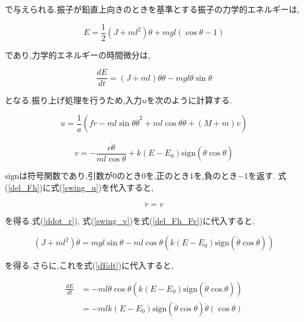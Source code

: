 で与えられる.振子が鉛直上向きのときを基準とする振子の力学的エネルギーは,

\begin{equation}
    E = \frac{1}{2} \left( J + ml^2 \right) \ddot{\theta}
        + mgl \left( \cos{\theta} - 1 \right)
\end{equation}

であり,力学的エネルギーの時間微分は,

\begin{equation}
    \frac{dE}{dt} = (J + ml) \theta \ddot{\theta}
                    - mgl \dot{\theta} \sin{\theta}
    \label{dEdt}
\end{equation}

となる.振り上げ処理を行うため,入力$u$を次のように計算する.

\begin{equation}
    u = \frac{1}{a}
        \left(
            f \dot{r} - ml \sin{\theta} \dot{\theta}^2 + ml \cos{\theta} \ddot{\theta}
            + (M + m)v
        \right)
    \label{swing_u}
\end{equation}

\begin{equation}
    v = - \frac{c \dot{\theta}}{ml\cos{\theta}} 
        + k(E - E_{0}) \mbox{sign}(\dot{\theta}\cos{\theta})
    \label{swing_v}
\end{equation}

$\mbox{sign}$は符号関数であり,引数が$0$のとき$0$を,正のとき$1$を,負のとき$-1$を返す.
式(\ref{del_Fh})に式(\ref{swing_u})を代入すると,

\begin{equation}
    \ddot{r} = v
    \label{ddot_r}
\end{equation}

を得る.式(\ref{ddot_r}), 式(\ref{swing_v})を式(\ref{del_Fh_Fv})に代入すると,

\begin{equation}
    (J + ml^2) \ddot{\theta} = mgl \sin{\theta}
                - ml \cos{\theta} (k(E - E_{0}) \mbox{sign} (\dot{\theta} \cos{\theta}))    
\end{equation}

を得る.さらに,これを式(\ref{dEdt})に代入すると,

\begin{equation*}
    \begin{split}
        \frac{dE}{dt} &= -ml \dot{\theta} \cos{\theta} (k(E - E_{0}) 
                            \mbox{sign} (\dot{\theta} \cos{\theta})) \\
                      &= -mlk(E - E_{0}) \mbox{sign} (\dot{\theta} \cos{\theta}) \dot{\theta} (\cos{\theta})
    \end{split}
\end{equation*}

